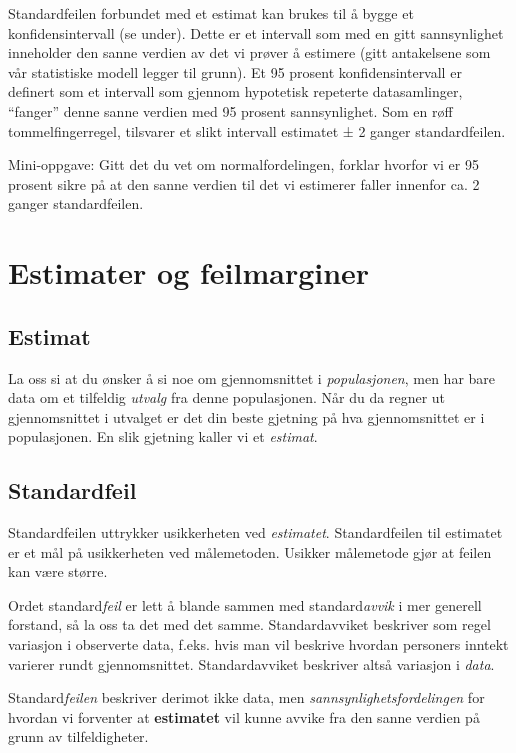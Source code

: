 \documentclass[
  norsk,
  letterpaper,
  DIV=11,
  numbers=noendperiod]{scrreprt}
\theoremstyle{definition}
\theoremstyle{remark}
\begin{document}
Standardfeilen forbundet med et estimat kan brukes til å bygge et
konfidensintervall (se under). Dette er et intervall som med en gitt
sannsynlighet inneholder den sanne verdien av det vi prøver å estimere
(gitt antakelsene som vår statistiske modell legger til grunn). Et 95
prosent konfidensintervall er definert som et intervall som gjennom
hypotetisk repeterte datasamlinger, ``fanger'' denne sanne verdien med
95 prosent sannsynlighet. Som en røff tommelfingerregel, tilsvarer et
slikt intervall estimatet ± 2 ganger standardfeilen.

Mini-oppgave: Gitt det du vet om normalfordelingen, forklar hvorfor vi
er 95 prosent sikre på at den sanne verdien til det vi estimerer faller
innenfor ca. 2 ganger standardfeilen.

\section{Estimater og feilmarginer}\label{estimater-og-feilmarginer}

\subsection{Estimat}\label{estimat}

La oss si at du ønsker å si noe om gjennomsnittet i \emph{populasjonen},
men har bare data om et tilfeldig \emph{utvalg} fra denne populasjonen.
Når du da regner ut gjennomsnittet i utvalget er det din beste gjetning
på hva gjennomsnittet er i populasjonen. En slik gjetning kaller vi et
\emph{estimat}.

\subsection{Standardfeil}\label{standardfeil}

Standardfeilen uttrykker usikkerheten ved \emph{estimatet}.
Standardfeilen til estimatet er et mål på usikkerheten ved målemetoden.
Usikker målemetode gjør at feilen kan være større.

Ordet standard\emph{feil} er lett å blande sammen med
standard\emph{avvik} i mer generell forstand, så la oss ta det med det
samme. Standardavviket beskriver som regel variasjon i observerte data,
f.eks. hvis man vil beskrive hvordan personers inntekt varierer rundt
gjennomsnittet. Standardavviket beskriver altså variasjon i \emph{data}.

Standard\emph{feilen} beskriver derimot ikke data, men
\emph{sannsynlighetsfordelingen} for hvordan vi forventer at
\textbf{estimatet} vil kunne avvike fra den sanne verdien på grunn av
tilfeldigheter.
\end{document}
